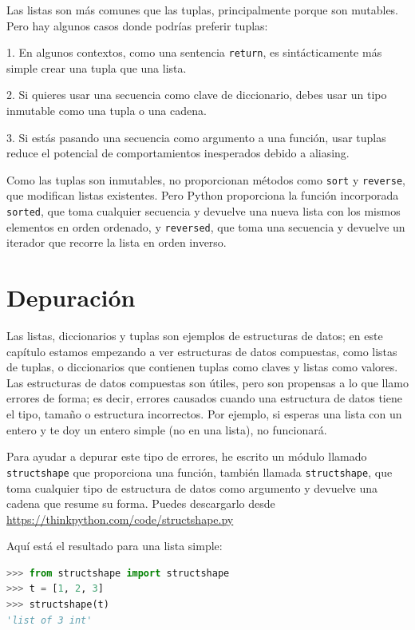 Las listas son más comunes que las tuplas, principalmente porque son mutables. Pero hay algunos casos donde podrías preferir tuplas:

1. En algunos contextos, como una sentencia \texttt{return}, es sintácticamente más simple crear una tupla que una lista.

2. Si quieres usar una secuencia como clave de diccionario, debes usar un tipo inmutable como una tupla o una cadena.

3. Si estás pasando una secuencia como argumento a una función, usar tuplas reduce el potencial de comportamientos inesperados debido a aliasing.

Como las tuplas son inmutables, no proporcionan métodos como \texttt{sort} y \texttt{reverse}, que modifican listas existentes. Pero Python proporciona la función incorporada \texttt{sorted}, que toma cualquier secuencia y devuelve una nueva lista con los mismos elementos en orden ordenado, y \texttt{reversed}, que toma una secuencia y devuelve un iterador que recorre la lista en orden inverso.

\section{Depuración}

Las listas, diccionarios y tuplas son ejemplos de estructuras de datos; en este capítulo estamos empezando a ver estructuras de datos compuestas, como listas de tuplas, o diccionarios que contienen tuplas como claves y listas como valores. Las estructuras de datos compuestas son útiles, pero son propensas a lo que llamo errores de forma; es decir, errores causados cuando una estructura de datos tiene el tipo, tamaño o estructura incorrectos. Por ejemplo, si esperas una lista con un entero y te doy un entero simple (no en una lista), no funcionará.

Para ayudar a depurar este tipo de errores, he escrito un módulo llamado \texttt{structshape} que proporciona una función, también llamada \texttt{structshape}, que toma cualquier tipo de estructura de datos como argumento y devuelve una cadena que resume su forma. Puedes descargarlo desde \url{https://thinkpython.com/code/structshape.py}

Aquí está el resultado para una lista simple:

\begin{lstlisting}[language=Python]
>>> from structshape import structshape
>>> t = [1, 2, 3]
>>> structshape(t)
'list of 3 int'
\end{lstlisting}


